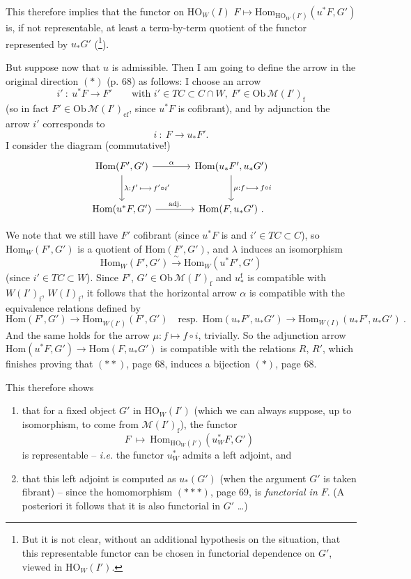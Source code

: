 \documentclass[11pt]{article}
\newcommand{\printedpage}[1]{\marginpar{\footnotesize p.~#1}}
\newcommand{\msp}[1]{\marginpar{\footnotesize [#1]}}
\newcommand{\M}{\mathcal{M}}
\newcommand{\Hom}{\mathrm{Hom}}
\newcommand{\HO}{\mathrm{HO}}
\newcommand{\Ob}{\mathrm{Ob}\,}
\newcommand{\rf}{\mathrm{f}}
\begin{document}
\printedpage{39}

This therefore implies that the functor on $\HO_W(I)$ $F \longmapsto \Hom_{\HO_{W}(I')}(u^*F,G')$ is, if not representable, at least a term-by-term quotient of the functor represented by $u_*G'$ (\footnote[37]{But it is not clear, without an additional hypothesis on the situation, that this representable functor can be chosen in functorial dependence on $G'$, viewed in $\HO_W(I')$.}).

\msp{page 70}

But suppose now that $u$ is admissible. Then I am going to define the arrow in the original direction $(*)$ (p. 68) as follows: I choose an arrow
\[
i' \ : \ u^*F \longrightarrow F' \qquad \text{with } i' \in TC \subset C \cap W,\ F' \in \Ob \M(I')_{\rf}
\]
(so in fact $F' \in \Ob \M(I')_{\mathrm{cf}}$, since $u^*F$ is cofibrant), and by adjunction the arrow $i'$ corresponds to
\[
i \ : \ F \longrightarrow u_*F'.
\]
I consider the diagram (commutative!)
\[
\begin{tikzcd}[column sep=large, row sep=large]
\Hom(F',G') \arrow[r, "\alpha"] \arrow[d, "{\scriptstyle \lambda:f'\,\longmapsto\, f'\circ i'}"] & \Hom(u_*F',u_*G') \arrow[d, "{\scriptstyle \mu:f\,\longmapsto\, f\circ i}"] \\
\Hom(u^*F,G') \arrow[r, "\text{adj.}"] & \Hom(F,u_*G')\ .
\end{tikzcd}
\]

We note that we still have $F'$ cofibrant (since $u^*F$ is and $i' \in TC \subset C$), so $\Hom_W(F',G')$ is a quotient of $\Hom(F',G')$, and $\lambda$ induces an isomorphism
\[
\Hom_W(F',G') \xrightarrow{\ \sim\ } \Hom_W(u^*F',G') %
\]
(since $i' \in TC \subset W$). Since $F'$, $G' \in \Ob \M(I')_{\rf}$ and $u_*^{\rf}$ is compatible with $W(I')_{\rf}$, $W(I)_{\rf}$, it follows that the horizontal arrow $\alpha$
\msp{page 71}
is compatible with the equivalence relations defined by
\[
\Hom(F',G') \longrightarrow \Hom_{W(I')}(F',G') \quad \text{resp.} \ \ \Hom(u_*F',u_*G') \longrightarrow \Hom_{W(I)}(u_*F',u_*G')\ .
\]
And the same holds for the arrow $\mu : f \longmapsto f \circ i$, trivially. So the adjunction arrow $\Hom(u^*F,G') \longrightarrow \Hom(F,u_*G')$ is compatible with the relations $R$, $R'$, which finishes proving that $(**)$, page 68, induces a bijection $(*)$, page 68.

This therefore shows

\begin{enumerate}
\item[1°)] that for a fixed object $G'$ in $\HO_W(I')$ (which we can always suppose, up to isomorphism, to come from $\M(I')_{\rf}$), the functor
\[
F \ \longmapsto\ \Hom_{\HO_{W}(I')}(u^*_W F,G')
\]
is representable -- \textit{i.e.} the functor $u^*_W$ admits a left adjoint, and
\item[2°)] that this left adjoint is computed as $u_*(G')$ (when the argument $G'$ is taken fibrant) -- since the homomorphism $({*}{*}{*})$, page 69, is \textit{functorial in $F$}. (A posteriori it follows that it is also functorial in $G'$ \dots)
\end{enumerate}
\end{document}
